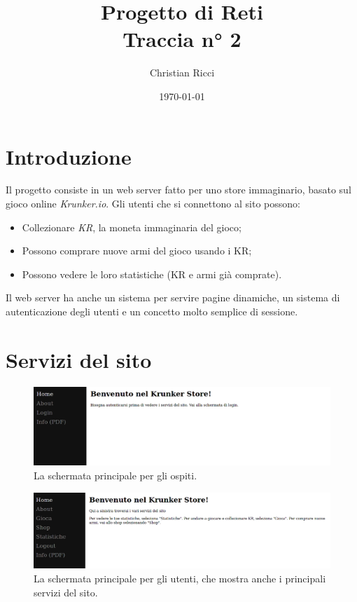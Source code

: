 \documentclass[a4paper,12pt]{report}
\title{Progetto di Reti \\
\large Traccia n° 2}
\author{Christian Ricci}
\date{\today}
\begin{document}
\maketitle
\tableofcontents

\chapter{Introduzione}

Il progetto consiste in un web server fatto per uno store immaginario, basato sul gioco online \textit{Krunker.io}. Gli utenti che si connettono al sito possono: 
\begin{itemize}
\item Collezionare \textit{KR}, la moneta immaginaria del gioco;
\item Possono comprare nuove armi del gioco usando i KR;
\item Possono vedere le loro statistiche (KR e armi già comprate).
\end{itemize}

Il web server ha anche un sistema per servire pagine dinamiche, un sistema di autenticazione degli utenti e un concetto molto semplice di sessione.

\chapter{Servizi del sito}

\begin{figure}[h]
\centering{}
\includegraphics[width=\textwidth]{home1.png}
\caption{La schermata principale per gli ospiti.}
\label{img:home_guest}
\end{figure}

\begin{figure}[h]
\centering{}
\includegraphics[width=\textwidth]{home2.png}
\caption{La schermata principale per gli utenti, che mostra anche i principali servizi del sito.}
\label{img:home_user}
\end{figure}
\end{document}

